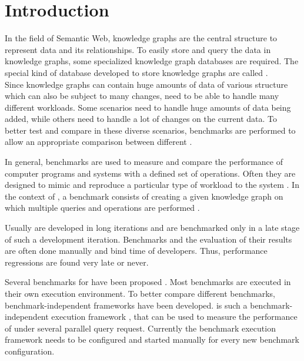 \chapter{Introduction}
\label{ch:introduction}




In the field of Semantic Web, knowledge graphs are the central structure to represent data and its relationships.
To easily store and query the data in knowledge graphs, some specialized knowledge graph databases are required.
The special kind of database developed to store knowledge graphs are called \tsp{}. \\

Since knowledge graphs can contain huge amounts of data of various structure which can also be subject to many changes, \tsp{} need to be able to handle many different workloads.
Some scenarios need to handle huge amounts of data being added, while others need to handle a lot of changes on the current data.
To better test and compare \tsp{} in these diverse scenarios, benchmarks are performed to allow an appropriate comparison between different \tsp{} \cite{saleemHowRepresentativeSPARQL2019}.

In general, benchmarks are used to measure and compare the performance of computer programs and systems with a defined set of operations.
Often they are designed to mimic and reproduce a particular type of workload to the system \cite{saleemFEASIBLEFeatureBasedSPARQL2015, morseyDBpediaSPARQLBenchmark2011}.
In the context of \tsp{}, a benchmark consists of creating a given knowledge graph on which multiple queries and operations are performed \cite{conradsIguanaGenericFramework2017}.

Usually \tsp{} are developed in long iterations and are benchmarked only in a late stage of such a development iteration.
Benchmarks and the evaluation of their results are often done manually and bind time of developers.
Thus, performance regressions are  found very late or never.


Several benchmarks for \tsp{} have been proposed \cite{saleemHowRepresentativeSPARQL2019}.
Most benchmarks are executed in their own execution environment.
To better compare different benchmarks, benchmark-independent frameworks have been developed.
\iguana{} is such a benchmark-independent execution framework \cite{conradsIguanaGenericFramework2017}, that can be used to measure the performance of \tsp{} under several parallel query request.
Currently the benchmark execution framework needs to be configured and started manually for every new benchmark configuration.

